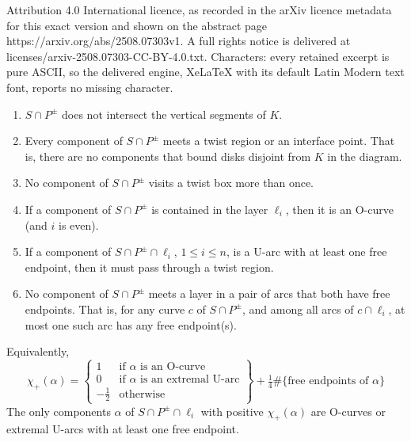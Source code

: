 \documentclass[10pt,a4paper]{amsart}
\begin{document}
Attribution 4.0 International licence, as recorded in the arXiv licence metadata for this exact version and shown on the abstract page https://arxiv.org/abs/2508.07303v1. A full rights notice is delivered at licenses/arxiv-2508.07303-CC-BY-4.0.txt. Characters: every retained excerpt is pure ASCII, so the delivered engine, XeLaTeX with its default Latin Modern text font, reports no missing character.
\begin{enumerate}[label = ($\diamondsuit$\arabic*)]
\item\label{no vertical intersection}  $S\cap P^\pm$ does not intersect the 
vertical segments of $K$.

\item \label{menasco no scc} Every component of $S\cap P^\pm$ meets a twist region or 
an interface point. That is, there are no components that bound disks disjoint from 
$K$ in the diagram. 

\item\label{menasco assumptions} No component of $S\cap P^\pm$ visits a twist 
box more than once.

\item\label{no scc in layers} If a component of $S\cap P^\pm$ is contained in the 
layer $\ell_i$, then it is an O-curve (and $i$ is even).

\item\label{no trivial U-arcs} 
If a component of $S\cap P^\pm\cap \ell_i$, $1\le i\le n$, is a U-arc with at 
least one free endpoint, then it must pass through a 
twist region.

\item\label{no double intersection outside} 
No component of $S\cap P^\pm$ meets a layer in a pair of arcs that both have 
free endpoints. That is, for any curve $c$ of $S\cap P^\pm$, and among all 
arcs of $c\cap \ell_i$, at most one such arc has any free endpoint(s).
\end{enumerate}

\begin{lemma}\label{Lem:ChiPlusFormula}
Equivalently,
\begin{equation}
    \chi_+(\alpha)=\begin{Bmatrix}
    1 & \text{if }\alpha\text{ is an O-curve}\\
    0 & \text{if }\alpha\text{ is an extremal U-arc}\\
    -\tfrac12 & \text{otherwise}
    \end{Bmatrix} + \tfrac14\#\{\text{free endpoints of }\alpha\}
\end{equation}
The only components $\alpha$ of $S\cap P^{\pm}\cap \ell_i$ with positive 
$\chi_+(\alpha)$ are O-curves or extremal U-arcs with at least one free endpoint.
\end{lemma}
\end{document}
